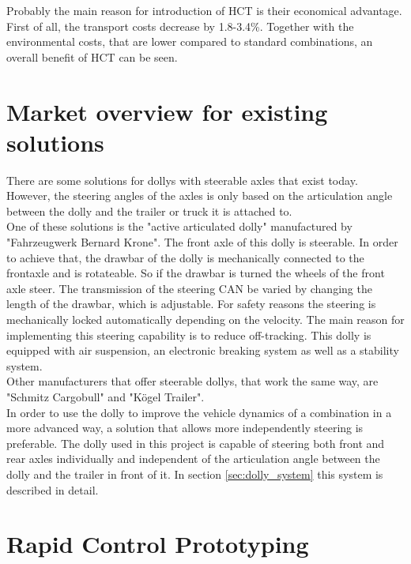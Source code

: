 \documentclass[ExampleMasters.tex]{subfiles}
\begin{document}
Probably the main reason for introduction of \gls{HCT} is their economical advantage. First of all, the transport costs decrease by 1.8-3.4\%. Together with the environmental costs, that are lower compared to standard combinations, an overall benefit of \gls{HCT} can be seen.\cite{EMS}


\section{Market overview for existing solutions}
\label{sec:market_overview}
There are some solutions for dollys with steerable axles that exist today. However, the steering angles of the axles is only based on the articulation angle between the dolly and the trailer or truck it is attached to. \\
One of these solutions is the "active articulated dolly" manufactured by "Fahrzeugwerk Bernard Krone". The front axle of this dolly is steerable. In order to achieve that, the drawbar of the dolly is mechanically connected to the frontaxle and is rotateable. So if the drawbar is turned the wheels of the front axle steer. The transmission of the steering \gls{CAN} be varied by changing the length of the drawbar, which is adjustable. For safety reasons the steering is mechanically locked automatically depending on the velocity. The main reason for implementing this steering capability is to reduce off-tracking. This dolly is equipped with air suspension, an electronic breaking system as well as a stability system. \cite{Krone_dolly} \\
Other manufacturers that offer steerable dollys, that work the same way, are "Schmitz Cargobull" and "K{\"o}gel Trailer". \cite{Kogel_dolly}\cite{Schmitz_dolly} \\
In order to use the dolly to improve the vehicle dynamics of a  combination in a more advanced way, a solution that allows more independently steering is preferable. The dolly used in this project is capable of steering both front and rear axles individually and independent of the articulation angle between the dolly and the trailer in front of it. In section \ref{sec:dolly_system} this system is described in detail.


\section{Rapid Control Prototyping}
\label{sec:rapid_proto}
\end{document}
